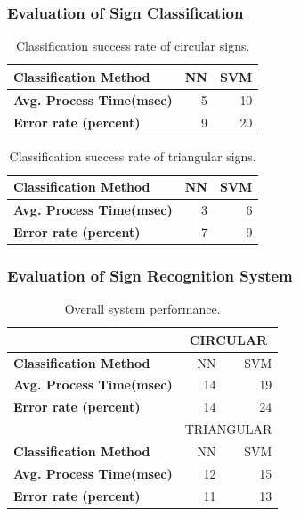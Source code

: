 \documentclass{beamer}
\begin{document}
\begin{frame}
	\frametitle{Evaluation of Sign Classification} 
	\begin{table}[ht]
	\centering
	\caption{Classification success rate of circular signs.}
	\label{signclassify-table-1}
	\begin{tabular}{|l r r|}
	\hline
	\textbf{Classification Method} & NN & SVM \\
	\hline
	\textbf{Avg. Process Time(msec)}			& 5 & 10 \\
	\textbf{Error rate (percent)}				& 9 &  20 \\
	\hline
	\end{tabular}
	\end{table}
	\begin{table}[ht]
	\centering
	\caption{Classification success rate of triangular signs.}
	\label{signclassify-table-2}
	\begin{tabular}{|l r r|}
	\hline
	\textbf{Classification Method} & NN  & SVM  \\
	\hline
	\textbf{Avg. Process Time(msec)}			& 3 & 6 \\
	\textbf{Error rate (percent)}				&  7 &  9 \\
	\hline
	\end{tabular}
	\end{table}	
\end{frame}

\begin{frame}
	\frametitle{Evaluation of Sign Recognition System} 
	\begin{table}[ht]
	\centering
	\caption{Overall system performance.}
	\label{signdetection-overall}
	\begin{tabular}{|l|r r|}
	\hline
	& \multicolumn{2}{c|}{CIRCULAR} \\
	\hline
	\textbf{Classification Method} & NN & SVM \\
	\hline
	\textbf{Avg. Process Time(msec)}			& 14 & 19 \\
	\hline
	\textbf{Error rate (percent)}				&  14 &  24 \\
	\hline
	\hline
	& \multicolumn{2}{c|}{TRIANGULAR} \\
	\hline
	\textbf{Classification Method} & NN & SVM \\
	\hline
	\textbf{Avg. Process Time(msec)}			& 12 & 15 \\
	\hline
	\textbf{Error rate (percent)}				&  11 &  13 \\
	\hline
	\end{tabular}
	\end{table}	
\end{frame}
\end{document}
